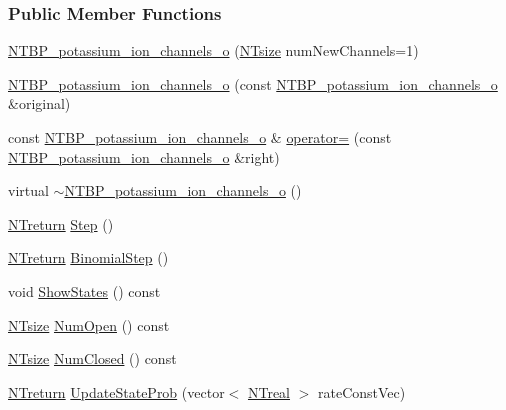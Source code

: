 \subsubsection*{Public Member Functions}
\begin{DoxyCompactItemize}
\item 
\hyperlink{class_n_t_b_p__potassium__ion__channels__o_a6ac461dabb381698589958af5879fedb}{NTBP\_\-potassium\_\-ion\_\-channels\_\-o} (\hyperlink{nt__types_8h_a06c124f2e4469769b58230253ce0560b}{NTsize} numNewChannels=1)
\item 
\hyperlink{class_n_t_b_p__potassium__ion__channels__o_aff6cb1b9b3c4d54c34fada898b8b6eed}{NTBP\_\-potassium\_\-ion\_\-channels\_\-o} (const \hyperlink{class_n_t_b_p__potassium__ion__channels__o}{NTBP\_\-potassium\_\-ion\_\-channels\_\-o} \&original)
\item 
const \hyperlink{class_n_t_b_p__potassium__ion__channels__o}{NTBP\_\-potassium\_\-ion\_\-channels\_\-o} \& \hyperlink{class_n_t_b_p__potassium__ion__channels__o_a65bfb2cec92d5df31880a785a17099e8}{operator=} (const \hyperlink{class_n_t_b_p__potassium__ion__channels__o}{NTBP\_\-potassium\_\-ion\_\-channels\_\-o} \&right)
\item 
virtual \hyperlink{class_n_t_b_p__potassium__ion__channels__o_a698eba6e3d0361204636097b8d11f641}{$\sim$NTBP\_\-potassium\_\-ion\_\-channels\_\-o} ()
\item 
\hyperlink{nt__types_8h_ab9564ee8f091e809d21b8451c6683c53}{NTreturn} \hyperlink{class_n_t_b_p__potassium__ion__channels__o_a11a41e197d4bc02fe0f19438047c1f6a}{Step} ()
\item 
\hyperlink{nt__types_8h_ab9564ee8f091e809d21b8451c6683c53}{NTreturn} \hyperlink{class_n_t_b_p__potassium__ion__channels__o_a166a2fcc5bc92616955ce78c1084fd7a}{BinomialStep} ()
\item 
void \hyperlink{class_n_t_b_p__potassium__ion__channels__o_a36b949514e4fbe579f27a2b4173e9caf}{ShowStates} () const 
\item 
\hyperlink{nt__types_8h_a06c124f2e4469769b58230253ce0560b}{NTsize} \hyperlink{class_n_t_b_p__potassium__ion__channels__o_afcd2354c53d4b027909fa03fcb6abf72}{NumOpen} () const 
\item 
\hyperlink{nt__types_8h_a06c124f2e4469769b58230253ce0560b}{NTsize} \hyperlink{class_n_t_b_p__potassium__ion__channels__o_a8b81cc2ba47625b28759c87f85bb50b8}{NumClosed} () const 
\item 
\hyperlink{nt__types_8h_ab9564ee8f091e809d21b8451c6683c53}{NTreturn} \hyperlink{class_n_t_b_p__potassium__ion__channels__o_af000db84e4f01e8f0e5af8f104711076}{UpdateStateProb} (vector$<$ \hyperlink{nt__types_8h_a814a97893e9deb1eedcc7604529ba80d}{NTreal} $>$ rateConstVec)

\end{DoxyCompactItemize}
